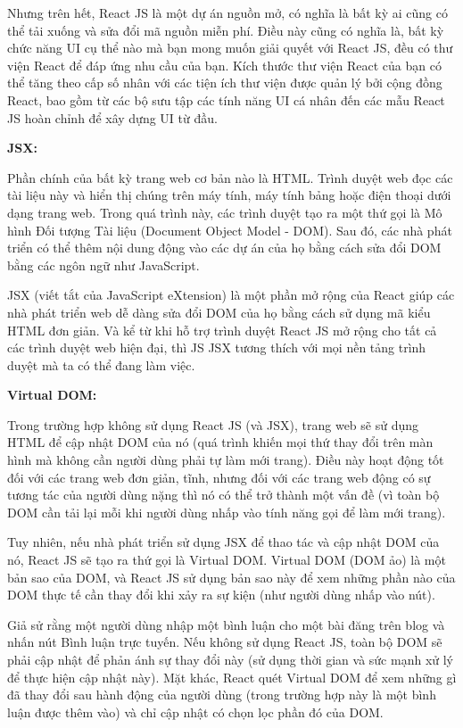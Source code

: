 Nhưng trên hết, React JS là một dự án nguồn mở, có nghĩa là bất kỳ ai cũng có thể tải xuống và sửa đổi mã nguồn miễn phí. Điều này cũng có nghĩa là, bất kỳ chức năng UI cụ thể nào mà bạn mong muốn giải quyết với React JS, đều có thư viện React để đáp ứng nhu cầu của bạn. Kích thước thư viện React của bạn có thể tăng theo cấp số nhân với các tiện ích thư viện được quản lý bởi cộng đồng React, bao gồm từ các bộ sưu tập các tính năng UI cá nhân đến các mẫu React JS hoàn chỉnh để xây dựng UI từ đầu.

\textbf{JSX:}

Phần chính của bất kỳ trang web cơ bản nào là HTML. Trình duyệt web đọc các tài liệu này và hiển thị chúng trên máy tính, máy tính bảng hoặc điện thoại dưới dạng trang web. Trong quá trình này, các trình duyệt tạo ra một thứ gọi là Mô hình Đối tượng Tài liệu (Document Object Model - DOM). Sau đó, các nhà phát triển có thể thêm nội dung động vào các dự án của họ bằng cách sửa đổi DOM bằng các ngôn ngữ như JavaScript.

JSX (viết tắt của JavaScript eXtension) là một phần mở rộng của React giúp các nhà phát triển web dễ dàng sửa đổi DOM của họ bằng cách sử dụng mã kiểu HTML đơn giản. Và kể từ khi hỗ trợ trình duyệt React JS mở rộng cho tất cả các trình duyệt web hiện đại, thì JS JSX tương thích với mọi nền tảng trình duyệt mà ta có thể đang làm việc.

\textbf{Virtual DOM:}

Trong trường hợp không sử dụng React JS (và JSX), trang web sẽ sử dụng HTML để cập nhật DOM của nó (quá trình khiến mọi thứ thay đổi trên màn hình mà không cần người dùng phải tự làm mới trang). Điều này hoạt động tốt đối với các trang web đơn giản, tĩnh, nhưng đối với các trang web động có sự tương tác của người dùng nặng thì nó có thể trở thành một vấn đề (vì toàn bộ DOM cần tải lại mỗi khi người dùng nhấp vào tính năng gọi để làm mới trang).

Tuy nhiên, nếu nhà phát triển sử dụng JSX để thao tác và cập nhật DOM của nó, React JS sẽ tạo ra thứ gọi là Virtual DOM. Virtual DOM (DOM ảo) là một bản sao của DOM, và React JS sử dụng bản sao này để xem những phần nào của DOM thực tế cần thay đổi khi xảy ra sự kiện (như người dùng nhấp vào nút).

Giả sử rằng một người dùng nhập một bình luận cho một bài đăng trên blog và nhấn nút Bình luận trực tuyến. Nếu không sử dụng React JS, toàn bộ DOM sẽ phải cập nhật để phản ánh sự thay đổi này (sử dụng thời gian và sức mạnh xử lý để thực hiện cập nhật này). Mặt khác, React quét Virtual DOM để xem những gì đã thay đổi sau hành động của người dùng (trong trường hợp này là một bình luận được thêm vào) và chỉ cập nhật có chọn lọc phần đó của DOM.

